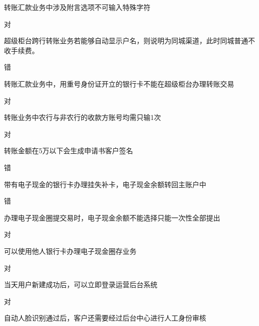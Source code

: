 \documentclass[kindlepaper]{BHCexam4kindle}
\begin{document}
\begin{questions}
\qs 转账汇款业务中涉及附言选项不可输入特殊字符 \xx
\begin{solution} 对 \end{solution}
\qs 超级柜台跨行转账业务若能够自动显示户名，则说明为同城渠道，此时同城普通不收手续费。 \xx
\begin{solution} 错 \end{solution}
\qs 转账汇款业务中，用重号身份证开立的银行卡不能在超级柜台办理转账交易 \xx
\begin{solution} 对 \end{solution}
\qs 转账业务中农行与非农行的收款方账号均需只输1次 \xx
\begin{solution} 对 \end{solution}
\qs 转账金额在5万以下会生成申请书客户签名 \xx
\begin{solution} 错 \end{solution}
\qs 带有电子现金的银行卡办理挂失补卡，电子现金余额转回主账户中 \xx
\begin{solution} 错 \end{solution}
\qs 办理电子现金圈提交易时，电子现金余额不能选择只能一次性全部提出 \xx
\begin{solution} 对 \end{solution}
\qs 可以使用他人银行卡办理电子现金圈存业务 \xx
\begin{solution} 对 \end{solution}
\qs 当天用户新建成功后，可以立即登录运营后台系统 \xx
\begin{solution} 对 \end{solution}
\qs 自动人脸识别通过后，客户还需要经过后台中心进行人工身份审核 \xx

\end{questions}
\end{document}
